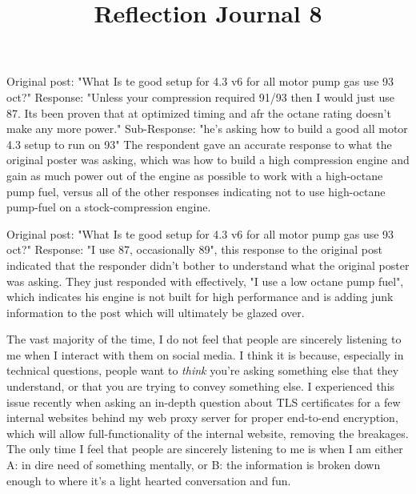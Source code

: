 \documentclass[12pt]{article}
\begin{document}
\title{Reflection Journal 8}
\par
Original post: "What Is te good setup for 4.3 v6 for all motor pump gas use 93 oct?" Response: "Unless your compression required 91/93 then I would just use 87. Its been proven that at optimized timing and afr the octane rating doesn't make any more power." Sub-Response: "he's asking how to build a good all motor 4.3 setup to run on 93" The respondent gave an accurate response to what the original poster was asking, which was how to build a high compression engine and gain as much power out of the engine as possible to work with a high-octane pump fuel, versus all of the other responses indicating not to use high-octane pump-fuel on a stock-compression engine.
\par
Original post: "What Is te good setup for 4.3 v6 for all motor pump gas use 93 oct?" Response: "I use 87, occasionally 89", this response to the original post indicated that the responder didn't bother to understand what the original poster was asking. They just responded with effectively, "I use a low octane pump fuel", which indicates his engine is not built for high performance and is adding junk information to the post which will ultimately be glazed over.
\par
The vast majority of the time, I do not feel that people are sincerely listening to me when I interact with them on social media. I think it is because, especially in technical questions, people want to \emph{think} you're asking something else that they understand, or that you are trying to convey something else. I experienced this issue recently when asking an in-depth question about TLS certificates for a few internal websites behind my web proxy server for proper end-to-end encryption, which will allow full-functionality of the internal website, removing the breakages. The only time I feel that people are sincerely listening to me is when I am either A: in dire need of something mentally, or B: the information is broken down enough to where it's a light hearted conversation and fun.
\end{document}
